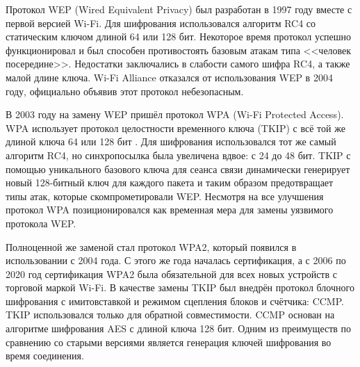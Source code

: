 	Протокол WEP (Wired Equivalent Privacy) был разработан в 1997 году вместе с первой версией Wi-Fi.
	Для шифрования использовался алгоритм RC4 со статическим ключом длиной 64 или 128 бит. Некоторое время
	протокол успешно функционировал и был способен противостоять базовым атакам типа <<человек посередине>>.
	Недостатки заключались в слабости самого шифра RC4, а также малой длине ключа. Wi-Fi Alliance отказался 
	от использования WEP в 2004 году, официально объявив этот протокол небезопасным.
	
	В 2003 году на замену WEP пришёл протокол WPA (Wi-Fi Protected Access). WPA использует протокол 
	целостности временного ключа (TKIP) с всё той же длиной ключа 64 или 128 бит \cite{802.11i-2004}. Для шифрования
	использовался тот же самый алгоритм RC4, но синхропосылка была увеличена вдвое: с 24 до 48 бит.
	TKIP с помощью уникального базового ключа для сеанса связи динамически генерирует новый 128-битный ключ для 
	каждого пакета и таким образом предотвращает типы атак, которые скомпрометировали WEP. Несмотря
	на все улучшения протокол WPA позиционировался как временная мера для замены уязвимого протокола
	WEP.
	
	Полноценной же заменой стал протокол WPA2, который появился в использовании с 2004 года. С этого
	же года началась сертификация, а с 2006 по 2020 год сертификация WPA2 была обязательной для всех
	новых устройств с торговой маркой Wi-Fi. В качестве замены TKIP был внедрён протокол блочного 
	шифрования с имитовставкой и режимом сцепления блоков и счётчика: CCMP. TKIP использовался
	только для обратной совместимости. CCMP основан на алгоритме шифрования AES с длиной ключа 128 бит.
	Одним из преимуществ по сравнению со старыми версиями является генерация ключей шифрования во время
	соединения.
	
